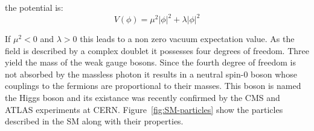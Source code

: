 the potential is:
\begin{equation}
\label{eq:higgs-potential}
V(\phi) = \mu^2|\phi|^2 + \lambda|\phi|^2
\end{equation}

If $\mu^2 < 0$ and $\lambda > 0$ this leads to a non zero vacuum expectation value. 
As the field is described by a complex doublet it possesses four degrees of freedom. 
Three yield the mass of the weak gauge bosons. Since the fourth degree of freedom is 
not absorbed by the massless photon it results in a neutral spin-0 boson whose couplings 
to the fermions are proportional to their masses. This boson is named the Higgs boson and
its existance was recently confirmed by the CMS and ATLAS experiments at CERN.
Figure~\ref{fig:SM-particles} show the particles described in the SM along with their properties.

